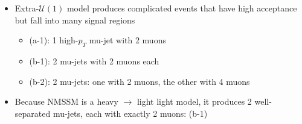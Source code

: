 \documentclass[compress]{beamer}
\begin{document}
\begin{frame}
\begin{itemize}
\item Extra-$\mathcal{U}(1)$ model produces complicated events that
  have high acceptance but fall into many signal regions
{\scriptsize \begin{itemize}
\item (a-1): 1 high-$p_T$ mu-jet with 2 muons
\item (b-1): 2 mu-jets with 2 muons each
\item (b-2): 2 mu-jets: one with 2 muons, the other with 4 muons
\end{itemize}}
\item Because NMSSM is a heavy $\to$ light light model, it produces 2
  well-separated mu-jets, each with exactly 2 muons: (b-1)
\end{itemize}
\end{frame}
\end{document}
